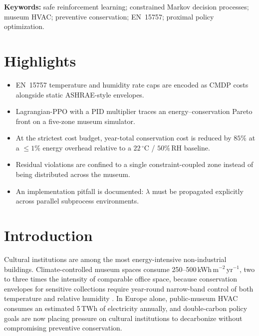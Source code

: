 \documentclass[11pt,a4paper]{article}
\begin{document}
\vspace{6pt}\noindent\textbf{Keywords:}
safe reinforcement learning;
constrained Markov decision processes;
museum HVAC;
preventive conservation;
EN~15757;
proximal policy optimization.

\section*{Highlights}
\begin{itemize}[leftmargin=*,nosep]
  \item EN~15757 temperature and humidity rate caps are encoded as CMDP
        costs alongside static ASHRAE-style envelopes.
  \item Lagrangian-PPO with a PID multiplier traces an energy--conservation
        Pareto front on a five-zone museum simulator.
  \item At the strictest cost budget, year-total conservation cost is
        reduced by $85\%$ at a $\le 1\%$ energy overhead relative to a
        $22\,^\circ$C / $50\%$\,RH baseline.
  \item Residual violations are confined to a single constraint-coupled
        zone instead of being distributed across the museum.
  \item An implementation pitfall is documented: $\lambda$ must be
        propagated explicitly across parallel subprocess environments.
\end{itemize}

\section{Introduction}\label{sec:intro}

Cultural institutions are among the most energy-intensive non-industrial
buildings. Climate-controlled museum spaces consume
250--500\,kWh\,m$^{-2}$\,yr$^{-1}$, two to three times the intensity of
comparable office space, because conservation envelopes for sensitive
collections require year-round narrow-band control of both temperature and
relative humidity \citep{ashrae_handbook_ch24,verticchio2024microclimate}.
In Europe alone, public-museum HVAC consumes an estimated 5\,TWh of
electricity annually, and double-carbon policy goals are now placing
pressure on cultural institutions to decarbonize without compromising
preventive conservation.
\end{document}
